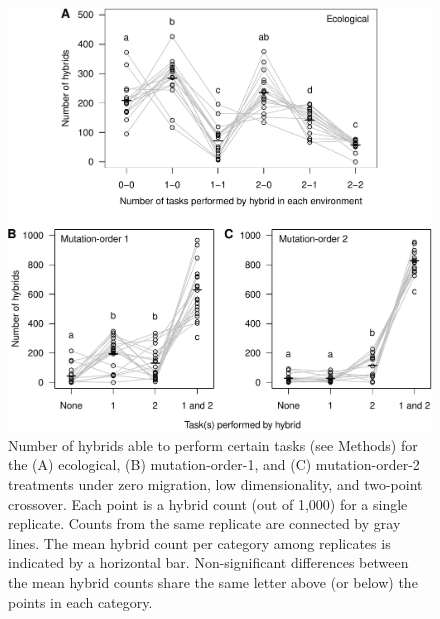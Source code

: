 \begin{doublespace}
\begin{figure}
\centering
\includegraphics[width=0.95\linewidth]{hybrid_counts.pdf}
\caption{Number of hybrids able to perform certain tasks (see Methods) for
  the (A) ecological, (B) mutation-order-1, and (C) mutation-order-2 treatments
  under zero migration, low dimensionality, and two-point crossover.
  Each point is a hybrid count (out of 1,000) for a single replicate.
  Counts from the same replicate are connected by gray lines.
  The mean hybrid count per category among replicates
  is indicated by a horizontal bar.
  Non-significant differences between the mean hybrid counts
  share the same letter above (or below) the points in each category.}
\label{hybrid_counts}
\end{figure}




\end{doublespace}
